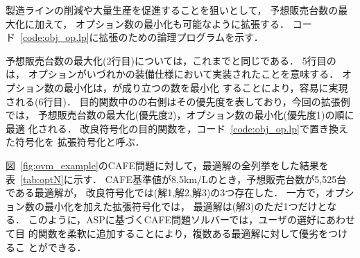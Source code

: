製造ラインの削減や大量生産を促進することを狙いとして，
予想販売台数の最大化に加えて，
オプション数の最小化も可能なように拡張する．
コード~\ref{code:obj_op.lp}に拡張のための論理プログラムを示す．

予想販売台数の最大化(2行目)については，これまでと同じである．
5行目のは，
オプションがいづれかの装備仕様において実装されたことを意味する．
オプション数の最小化は，が成り立つの数を最小化
することにより，容易に実現される(6行目)．
目的関数中のの右側はその優先度を表しており，今回の拡張例では，
予想販売台数の最大化(優先度2)，オプション数の最小化(優先度1)の順に最適
化される．
改良符号化の目的関数を，コード~\ref{code:obj_op.lp}で置き換えた符号化を
拡張符号化と呼ぶ．

図~\ref{fig:ovm_example}のCAFE問題に対して，最適解の全列挙をした結果を
表~\ref{tab:optN}に示す．
CAFE基準値が8.5km/Lのとき，予想販売台数が5,525台である最適解が，
改良符号化では(解1,解2,解3)の3つ存在した．
一方で，オプション数の最小化を加えた拡張符号化では，
最適解は(解3)のただ1つだけとなる．
このように，ASPに基づくCAFE問題ソルバーでは，ユーザの選好にあわせて目
的関数を柔軟に追加することにより，複数ある最適解に対して優劣をつけるこ
とができる．


